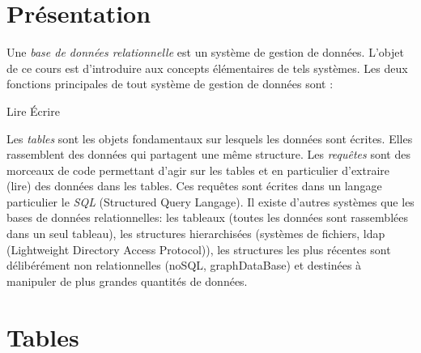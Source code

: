 

\section{Présentation}
Une \emph{base de données relationnelle} est un système de gestion de données. L'objet de ce cours est d'introduire aux concepts élémentaires de tels systèmes.\newline
Les deux fonctions principales de tout système de gestion de données sont :
\begin{center}
 \hspace{3cm}  Lire \hfill \'Ecrire \hspace*{3cm}
\end{center}
Les \emph{tables} sont les objets fondamentaux sur lesquels les données sont écrites. Elles rassemblent des données qui partagent une même structure. Les \emph{requêtes} sont des morceaux de code permettant d'agir sur les tables et en particulier d'extraire (lire) des données dans les tables. Ces requêtes sont écrites dans un langage particulier le \emph{SQL} (Structured Query Langage).\newline
Il existe d'autres systèmes que les bases de données relationnelles: les tableaux (toutes les données sont rassemblées dans un seul tableau),
les structures hierarchisées (systèmes de fichiers, ldap (Lightweight Directory Access Protocol)), les structures les plus récentes sont délibérément non relationnelles (noSQL, graphDataBase) et destinées à manipuler de plus grandes quantités de données.
  
\section{Tables}
